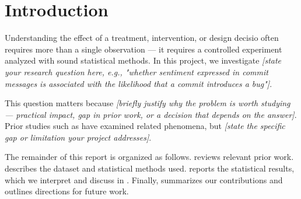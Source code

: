 \section{Introduction}
\label{S:introduction}


Understanding the effect of a treatment, intervention, or design decisio often requires more than a single observation — it requires a controlled experiment analyzed with sound statistical methods. In this project, we investigate \textit{[state your research question here, e.g., "whether sentiment expressed in commit messages is associated with the likelihood that a commit introduces a bug"]}.

This question matters because \textit{[briefly justify why the problem is worth studying — practical impact, gap in prior work, or a decision that depends on the answer]}. Prior studies such as \citet{smith2020} have examined related phenomena, but \textit{[state the specific gap or limitation your project addresses]}.

The remainder of this report is organized as follows.  reviews relevant prior work.  describes the dataset and statistical methods used.  reports the statistical results, which we interpret and discuss in . Finally,  summarizes our contributions and outlines directions for future work.